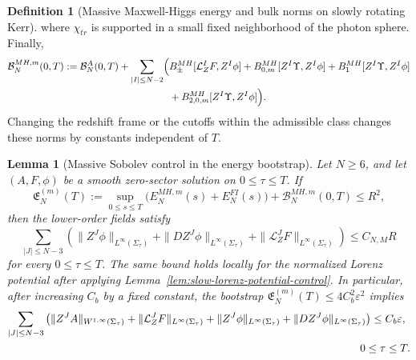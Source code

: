 \documentclass[11pt]{article}
\numberwithin{equation}{section}
\theoremstyle{plain}
\newtheorem{lemma}[theorem]{Lemma}
\theoremstyle{definition}
\newtheorem{definition}{Definition}[section]
\theoremstyle{remark}
\begin{document}
\begin{definition}[Massive Maxwell-Higgs energy and bulk norms on slowly rotating Kerr]
where \(\chi_{tr}\) is supported in a small fixed neighborhood of the photon sphere.  Finally,
\begin{equation}\label{eq:slow-bulk-massive-def}
\begin{aligned}
 \mathcal B_{N}^{MH,m}(0,T)
 :=
 \mathcal B_N^A(0,T)+
 \sum_{|I|\le N-2}
 \Bigl(&
 B_{\pm}^{MH}[\mathcal L_Z^IF,Z^I\phi]
 +B_{0,m}^{MH}[Z^I\Upsilon,Z^I\phi]
 +B_{1}^{MH}[Z^I\Upsilon,Z^I\phi]\\
 &+B_{2,0,m}^{MH}[Z^I\Upsilon,Z^I\phi]
 \Bigr).
\end{aligned}
\end{equation}
Changing the redshift frame or the cutoffs within the admissible class changes these norms by constants independent of \(T\).
\end{definition}

\begin{lemma}[Massive Sobolev control in the energy bootstrap]\label{lem:slow-massive-sobolev-bootstrap}
Let \(N\ge6\), and let \((A,F,\phi)\) be a smooth zero-sector solution on \(0\le\tau\le T\).  If
\begin{equation}
 \mathfrak E_N^{(m)}(T):=
 \sup_{0\le s\le T}\bigl(E_N^{MH,m}(s)+E_N^{FI}(s)\bigr)
 +\mathcal B_N^{MH,m}(0,T)
 \le R^2,
\end{equation}
then the lower-order fields satisfy
\begin{equation}\label{eq:slow-pointwise-bootstrap-generic}
 \sum_{|J|\le N-3}
 \left(
 \|Z^J\phi\|_{L^\infty(\Sigma_\tau)}
 +\|D Z^J\phi\|_{L^\infty(\Sigma_\tau)}
 +\|\mathcal L_Z^JF\|_{L^\infty(\Sigma_\tau)}
 \right)
 \le C_{N,M}R
\end{equation}
for every \(0\le\tau\le T\).  The same bound holds locally for the normalized Lorenz potential after applying Lemma~\ref{lem:slow-lorenz-potential-control}.  In particular, after increasing \(C_b\) by a fixed constant, the bootstrap \(\mathfrak E_N^{(m)}(T)\le4C_b^2\varepsilon^2\) implies
\begin{equation}\label{eq:slow-pointwise-bootstrap}
\begin{split}
 \sum_{|J|\le N-3}
 \left(
 \|Z^JA\|_{W^{1,\infty}(\Sigma_\tau)}
 +\|\mathcal L_Z^JF\|_{L^\infty(\Sigma_\tau)}
 +\|Z^J\phi\|_{L^\infty(\Sigma_\tau)}
 +\|D Z^J\phi\|_{L^\infty(\Sigma_\tau)}
 \right)
 &\le C_b\varepsilon,\\
 &\hspace{-1em}0\le\tau\le T.
\end{split}
\end{equation}
\end{lemma}
\end{document}
